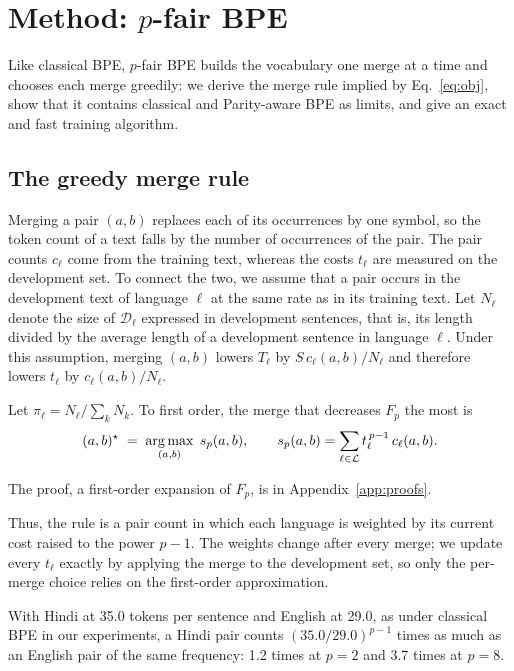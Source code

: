 \section{Method: $p$-fair BPE}
\label{sec:method}

Like classical BPE, $p$-fair BPE builds the vocabulary one merge at a time and chooses each
merge greedily: we derive the merge rule implied by Eq.~\eqref{eq:obj}, show that it contains
classical and Parity-aware BPE as limits, and give an exact and fast training algorithm.

\subsection{The greedy merge rule}
\label{sec:rule}

Merging a pair $(a,b)$ replaces each of its occurrences by one symbol, so the token count
of a text falls by the number of occurrences of the pair. The pair counts $c_\ell$ come from
the training text, whereas the costs $t_\ell$ are measured on the development set. To
connect the two, we assume that a pair occurs in the development text of language $\ell$ at
the same rate as in its training text. Let $N_\ell$ denote the size of $\mathcal{D}_\ell$
expressed in development sentences, that is, its length divided by the average length of a
development sentence in language $\ell$. Under this assumption, merging $(a,b)$ lowers
$T_\ell$ by $S\,c_\ell(a,b)/N_\ell$ and therefore lowers $t_\ell$ by $c_\ell(a,b)/N_\ell$.

\begin{proposition}
\label{prop:rule}
Let $\pi_\ell = N_\ell/\sum_k N_k$. To first order, the merge that decreases $F_p$ the most
is
\begin{equation}
  (a,b)^\star \;=\; \operatorname*{arg\,max}_{(a,b)}\; s_p(a,b), \qquad
  s_p(a,b) = \sum_{\ell\in\mathcal{L}} t_\ell^{\,p-1}\, c_\ell(a,b).
  \label{eq:rule}
\end{equation}
\end{proposition}
The proof, a first-order expansion of $F_p$, is in Appendix~\ref{app:proofs}.


Thus, the rule is a pair count in which each language is weighted by its current cost raised
to the power $p-1$. The weights change after every merge; we update every $t_\ell$ exactly
by applying the merge to the development set, so only the per-merge choice relies on the
first-order approximation.

With Hindi at 35.0 tokens per sentence and English at 29.0, as under classical BPE in our
experiments, a Hindi pair counts $(35.0/29.0)^{p-1}$ times as much as an English pair of the
same frequency: 1.2 times at $p=2$ and 3.7 times at $p=8$.

